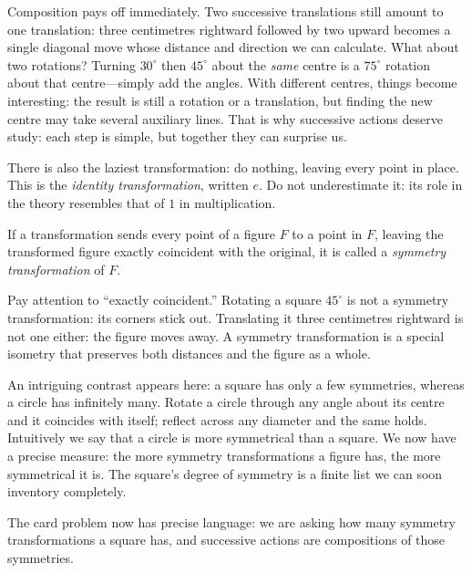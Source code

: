Composition pays off immediately. Two successive translations still amount to one translation: three centimetres rightward followed by two upward becomes a single diagonal move whose distance and direction we can calculate. What about two rotations? Turning $30^\circ$ then $45^\circ$ about the \emph{same} centre is a $75^\circ$ rotation about that centre---simply add the angles. With different centres, things become interesting: the result is still a rotation or a translation, but finding the new centre may take several auxiliary lines. That is why successive actions deserve study: each step is simple, but together they can surprise us.

There is also the laziest transformation: do nothing, leaving every point in place. This is the \emph{identity transformation}, written $e$. Do not underestimate it: its role in the theory resembles that of $1$ in multiplication.

\begin{dingyi}
If a transformation sends every point of a figure $F$ to a point in $F$, leaving the transformed figure exactly coincident with the original, it is called a \emph{symmetry transformation} of $F$.
\end{dingyi}

Pay attention to ``exactly coincident.'' Rotating a square $45^\circ$ is not a symmetry transformation: its corners stick out. Translating it three centimetres rightward is not one either: the figure moves away. A symmetry transformation is a special isometry that preserves both distances and the figure as a whole.

An intriguing contrast appears here: a square has only a few symmetries, whereas a circle has infinitely many. Rotate a circle through any angle about its centre and it coincides with itself; reflect across any diameter and the same holds. Intuitively we say that a circle is more symmetrical than a square. We now have a precise measure: the more symmetry transformations a figure has, the more symmetrical it is. The square's degree of symmetry is a finite list we can soon inventory completely.

The card problem now has precise language: we are asking how many symmetry transformations a square has, and successive actions are compositions of those symmetries.

